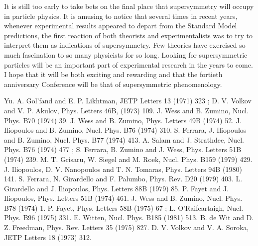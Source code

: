 \documentclass[a4paper,11pt]{article}
\begin{document}
It is still too early to take bets on the final place that
supersymmetry will occupy in particle physics. It is amusing  to
notice that several times in recent years, whenever experimental results 
appeared to depart from the Standard Model predictions, the first
reaction of both theorists and experimentalists  was to try to 
interpret them as indications of supersymmetry. Few theories have
exercised so much fascination to so many physicists for so long. Looking for supersymmetric
particles will be an important part of experimental research in the
years to come. I hope that it will be both exciting and rewarding and
that the fortieth anniversary Conference will be that of
supersymmetric phenomenology.     



 




\vskip2cm

\begin{thebibliography}{99}
 Yu. A. Gol'fand and E. P. Likhtman, JETP Letters 13 (1971) 323 ; D. V. Volkov and V. P. Akulov, Phys. Letters 46B, (1973) 109.
 J. Wess and B. Zumino, Nucl. Phys. B70 (1974) 39.
 J. Wess and B. Zumino, Phys. Letters 49B (1974) 52.
 J. Iliopoulos and B. Zumino, Nucl. Phys. B76 (1974) 310.
 S. Ferrara, J. Iliopoulos and B. Zumino, Nucl. Phys. B77 (1974) 413.
 A. Salam and J. Strathdee, Nucl. Phys. B76 (1974) 477 ; S. Ferrara, B. Zumino and J. Wess, Phys. Letters 51B (1974) 239.
 M. T. Grisaru, W. Siegel and M. Ro\coordHE{}ek, Nucl. Phys. B159 (1979) 429.
 J. Iliopoulos, D. V. Nanopoulos and T. N. Tomaras, Phys. Letters 94B (1980) 141.
 S. Ferrara, N. Girardello and F. Palumbo, Phys. Rev. D20 (1979) 403.
 L. Girardello and J. Iliopoulos, Phys. Letters 88B (1979) 85.
 P. Fayet and J. Iliopoulos, Phys. Letters 51B (1974) 461.
 J. Wess and B. Zumino, Nucl. Phys. B78 (1974) 1.
 P. Fayet, Phys. Letters 58B (1975) 67 ;
L. O'Raifeartaigh, Nucl. Phys. B96 (1975) 331.
 E. Witten, Nucl. Phys. B185 (1981) 513.
 B. de Wit and D. Z. Freedman, Phys. Rev. Letters 35
(1975) 827.
 D. V. Volkov and V. A. Soroka, JETP Letters 18 (1973) 312.

\end{thebibliography}
\end{document}
